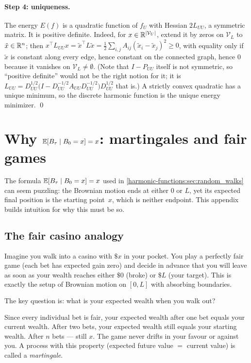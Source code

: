 \begin{notechapter}
\paragraph{Step 4: uniqueness.} The energy $E(f)$ is a quadratic function of $f_U$
with Hessian $2L_{UU}$, a symmetric matrix. It is positive definite. Indeed, for $x\in\mathbb{R}^{\left|\mathcal V_U\right|}$, extend it by zeros on $\mathcal V_L$
to $\tilde x\in\mathbb{R}^n$; then $x^\top L_{UU}x = \tilde x^\top L\tilde x = \frac12\sum_{i,j}A_{ij}(\tilde x_i - \tilde x_j)^2\geq0$, with equality only if $\tilde x$ is constant along every edge,
hence constant on the connected graph, hence $0$ because it vanishes on $\mathcal V_L\neq\emptyset$. (Note that
$I - P_{UU}$ itself is not symmetric, so ``positive definite'' would not be the right notion for it; it is
$L_{UU} = D_{UU}^{1/2}\bigl(I - D_{UU}^{-1/2}A_{UU}D_{UU}^{-1/2}\bigr)D_{UU}^{1/2}$ that is.) A strictly convex quadratic has a unique minimum, so the discrete harmonic
function is the unique energy minimizer. \qed

\newpage
\section{Why $\mathbb{E}[B_\tau \mid B_0 = x] = x$: martingales and fair games}
\label{harmonic-functions:app:martingale}

The formula $\mathbb{E}[B_\tau \mid B_0 = x] = x$ used in
\cref{harmonic-functions:sec:random_walks} can seem puzzling: the Brownian motion ends
at either $0$ or $L$, yet its expected final position is the starting
point~$x$, which is neither endpoint. This appendix builds intuition for
why this must be so.

\subsection*{The fair casino analogy}

Imagine you walk into a casino with $\$x$ in your pocket. You play a
perfectly fair game (each bet has expected gain zero) and decide in advance
that you will leave as soon as your wealth reaches either $\$0$ (broke) or
$\$L$ (your target). This is exactly the setup of Brownian motion on
$[0, L]$ with absorbing boundaries.

The key question is: what is your expected wealth when you walk out?

Since every individual bet is fair, your expected wealth after one bet equals
your current wealth. After two bets, your expected wealth still equals your
starting wealth. After $n$ bets --- still $x$. The game never drifts in your
favour or against you. A process with this property (expected future value
$=$ current value) is called a \emph{martingale}.


\end{notechapter}
